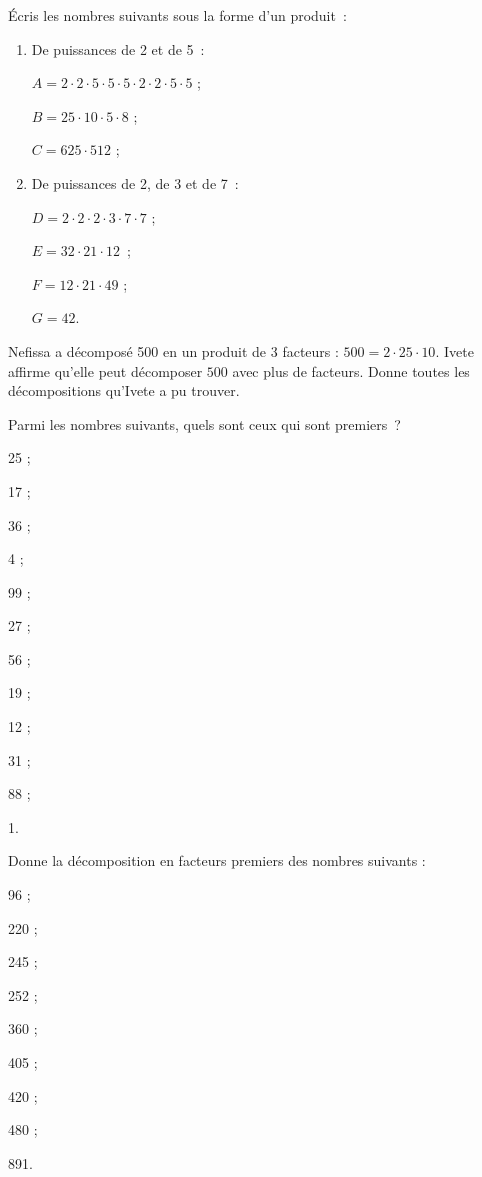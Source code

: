\begin{exercice}
Écris les nombres suivants sous la forme d'un produit :
\begin{enumerate}
 \item De puissances de 2 et de 5 :
 
$A = 2 \cdot 2 \cdot 5 \cdot 5 \cdot 5 \cdot 2 \cdot 2 \cdot 5 \cdot 5$ ;

$B = 25 \cdot 10 \cdot 5 \cdot 8$ ;

$C = 625 \cdot 512$ ;
 \item De puissances de 2, de 3 et de 7 :
 
$D = 2 \cdot 2 \cdot 2 \cdot 3 \cdot 7 \cdot 7$ ;

$E = 32 \cdot 21 \cdot 12$ ;

$F = 12 \cdot 21 \cdot 49$ ;

$G = 42$.
 \end{enumerate}
\end{exercice} 

\begin{exercice}
Nefissa a décomposé 500 en un produit de 3 facteurs : $500 = 2 \cdot 25 \cdot 10$. Ivete affirme qu'elle peut décomposer $500$ avec plus de facteurs. Donne toutes les décompositions qu'Ivete a pu trouver.
\end{exercice} 

\begin{exercice}
Parmi les nombres suivants, quels sont ceux qui sont premiers ?
\begin{colitemize}{4}
 \item 25 ;
 \item 17 ;
 \item 36 ;
 \item 4 ;
 \item 99 ;
 \item 27 ;
 \item 56 ;
 \item 19 ;
 \item 12 ;
 \item 31 ;
 \item 88 ;
 \item 1.
 \end{colitemize}
\end{exercice} 

\begin{exercice}
Donne la décomposition en facteurs premiers des nombres suivants :
\begin{colenumerate}{3}
 \item 96 ;
 \item 220 ;
 \item 245 ;
 \item 252 ;
 \item 360 ;
 \item 405 ;
 \item 420 ;
 \item 480 ;
 \item 891.
 \end{colenumerate}
\end{exercice} 


